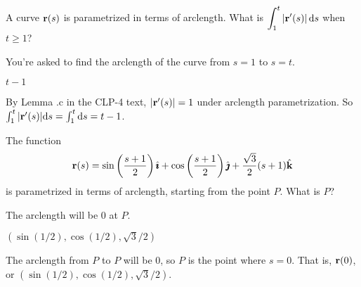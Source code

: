 

\subsection*{\Conceptual}

\begin{question}
A curve $\mathbf{r}(s)$ is parametrized in terms of arclength. What is  $\displaystyle\int_1^t |\mathbf{r}'(s)|\,\mathrm{d}s$ when $t \ge 1$?
\end{question}
\begin{hint}
You're asked to find the arclength of the curve from $s=1$ to $s=t$.
\end{hint}
\begin{answer}
$t-1$
\end{answer}
\begin{solution}
By Lemma .c in the CLP-4 text, $|\mathbf{r}'(s)|=1$
under arclength parametrization. So 
$\int_1^t |\mathbf{r}'(s)|\mathrm{d}s=\int_1^t \mathrm{d}s=t-1$.
\end{solution}



\begin{question}
The function
\[\mathbf{r}(s)=\sin\left(\frac{s+1}{2}\right)\hat{\pmb{\imath}}+\cos\left(\frac{s+1}{2}\right)\hat{\pmb{\jmath}}+\frac{\sqrt3}{2}(s+1)\hat{\mathbf{k}}\]
 is parametrized in terms of arclength, starting from the point $P$. What is $P$?
\end{question}
\begin{hint}
The arclength will be 0 at $P$.
\end{hint}
\begin{answer}
$\left( \sin(1/2),\cos(1/2),\sqrt{3}/2\right)$
\end{answer}
\begin{solution}
The arclength from $P$ to $P$ will be 0, so $P$ is the point where $s=0$. That is, $\mathbf{r}(0)$, or 
$\left( \sin(1/2),\cos(1/2),\sqrt{3}/2\right)$.
\end{solution}

